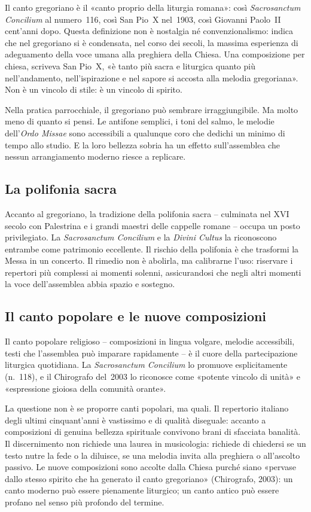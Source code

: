 \documentclass[12pt,a4paper]{article}
\begin{document}
	Il canto gregoriano è il «canto proprio della liturgia romana»: così
	\emph{Sacrosanctum Concilium} al numero~116, così San Pio~X nel~1903, così
	Giovanni Paolo~II cent'anni dopo. Questa definizione non è nostalgia né
	convenzionalismo: indica che nel gregoriano si è condensata, nel corso dei
	secoli, la massima esperienza di adeguamento della voce umana alla preghiera
	della Chiesa. Una composizione per chiesa, scriveva San Pio~X, «è tanto più
	sacra e liturgica quanto più nell'andamento, nell'ispirazione e nel sapore si
	accosta alla melodia gregoriana». Non è un vincolo di stile: è un vincolo di
	spirito.
	
	Nella pratica parrocchiale, il gregoriano può sembrare irraggiungibile. Ma molto
	meno di quanto si pensi. Le antifone semplici, i toni del salmo, le melodie
	dell'\emph{Ordo Missae} sono accessibili a qualunque coro che dedichi un minimo
	di tempo allo studio. E la loro bellezza sobria ha un effetto sull'assemblea che
	nessun arrangiamento moderno riesce a replicare.
	
	\subsection{La polifonia sacra}
	
	Accanto al gregoriano, la tradizione della polifonia sacra -- culminata nel XVI
	secolo con Palestrina e i grandi maestri delle cappelle romane -- occupa un posto
	privilegiato. La \emph{Sacrosanctum Concilium} e la \emph{Divini Cultus} la
	riconoscono entrambe come patrimonio eccellente. Il rischio della polifonia è
	che trasformi la Messa in un concerto. Il rimedio non è abolirla, ma calibrarne
	l'uso: riservare i repertori più complessi ai momenti solenni, assicurandosi che
	negli altri momenti la voce dell'assemblea abbia spazio e sostegno.
	
	\subsection{Il canto popolare e le nuove composizioni}
	
	Il canto popolare religioso -- composizioni in lingua volgare, melodie
	accessibili, testi che l'assemblea può imparare rapidamente -- è il cuore della
	partecipazione liturgica quotidiana. La \emph{Sacrosanctum Concilium} lo
	promuove esplicitamente (n.~118), e il Chirografo del~2003 lo riconosce come
	«potente vincolo di unità» e «espressione gioiosa della comunità orante».
	
	La questione non è se proporre canti popolari, ma quali. Il repertorio italiano
	degli ultimi cinquant'anni è vastissimo e di qualità diseguale: accanto a
	composizioni di genuina bellezza spirituale convivono brani di sfacciata
	banalità. Il discernimento non richiede una laurea in musicologia: richiede di
	chiedersi se un testo nutre la fede o la diluisce, se una melodia invita alla
	preghiera o all'ascolto passivo. Le nuove composizioni sono accolte dalla Chiesa
	purché siano «pervase dallo stesso spirito che ha generato il canto gregoriano»
	(Chirografo, 2003): un canto moderno può essere pienamente liturgico; un canto
	antico può essere profano nel senso più profondo del termine.
	
\end{document}
